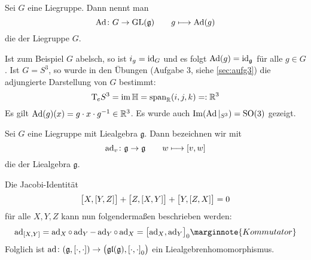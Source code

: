 \begin{definition}[{name=[adjungierte Darstellung der Liegruppe]}]
	Sei $G$ eine Liegruppe.
	Dann nennt man 
	\[
		\Ad \colon G \to \GL(\mathfrak{g}) \qquad g \longmapsto \Ad(g)
	\]
	die  der Liegruppe $G$.
\end{definition}

Ist zum Beispiel $G$ abelsch, so ist $i_g = \id_G$ und es folgt ${\Ad(g)} = \id_{\mathfrak{g}}$ für alle $g \in G$.
Ist $G=S^3$, so wurde in den Übungen (Aufgabe 3, siehe \cref{sec:aufg3}) die adjungierte Darstellung von $G$ bestimmt:
\[
	\Tmap_e S^3 = \im \mathbb{H} = \Span_\mathbb{R} (i,j,k) =: \mathbb{R}^3
\]
Es gilt $\Ad(g)(x) = g \cdot x \cdot g^{-1} \in \mathbb{R}^3$.
Es wurde auch $\Im \enbrace*{\Ad|_{S^3}} = \SO(3)$ gezeigt.

\begin{definition}[{name=[adjungierte Darstellung der Liealgebra]}]
	Sei $G$ eine Liegruppe mit Liealgebra $\mathfrak{g}$.
	Dann bezeichnen wir mit 
	\[
		\ad_v \colon \mathfrak{g} \to \mathfrak{g} \qquad w \longmapsto \benbrace*{v,w}
	\]
	die  der Liealgebra $\mathfrak{g}$.
\end{definition}

Die Jacobi-Identität 
\[
	\benbrace[\big]{X,\benbrace*{Y,Z}} + \benbrace[\big]{Z, \benbrace*{X,Y}} + \benbrace[\big]{Y, \benbrace*{Z,X}} =0
\]
für alle $X,Y,Z$ kann nun folgendermaßen beschrieben werden:
\[
	\ad_{\benbrace*{X,Y}} = \ad_X \circ \ad_Y - \ad_Y \circ \ad_X = \benbrace[\big]{\ad_X, \ad_Y}_0 \marginnote{Kommutator}
\]
Folglich ist $\ad \colon \enbrace*{\mathfrak{g}, \benbrace*{\cdot ,\cdot }} \to \enbrace[\big]{\mathfrak{gl}(\mathfrak{g}), \benbrace*{\cdot ,\cdot }_0}$
ein Liealgebrenhomomorphismus.

